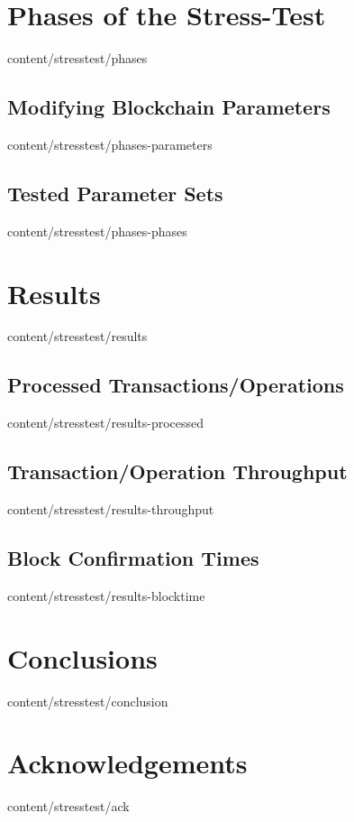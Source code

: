 \documentclass{btswhitepaper}
\begin{document}
\section    { Phases of the Stress-Test          }  { content/stresstest/phases             } 
\subsection { Modifying Blockchain Parameters    }  { content/stresstest/phases-parameters  } 
\subsection { Tested Parameter Sets              }  { content/stresstest/phases-phases      } 
\section    { Results                            }  { content/stresstest/results            } 
\subsection { Processed Transactions/Operations  }  { content/stresstest/results-processed  } 
\subsection { Transaction/Operation Throughput   }  { content/stresstest/results-throughput } 
\subsection { Block Confirmation Times           }  { content/stresstest/results-blocktime  } 
\section    { Conclusions                        }  { content/stresstest/conclusion         } 
\section    { Acknowledgements                   }  { content/stresstest/ack                } 



\end{document}
